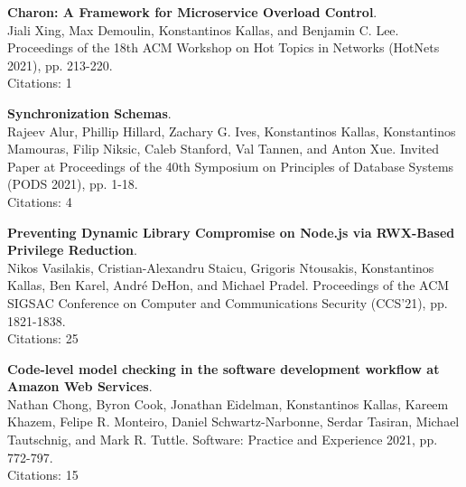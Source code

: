 \begin{minipage}{\textwidth}
\textbf{Charon: A Framework for Microservice Overload Control}. \\
Jiali Xing, Max Demoulin, Konstantinos Kallas, and Benjamin C. Lee.
Proceedings of the 18th ACM Workshop on Hot Topics in Networks (HotNets 2021), pp. 213-220. \\
Citations: 1
\end{minipage}

\begin{minipage}{\textwidth}
\textbf{Synchronization Schemas}. \\
Rajeev Alur, Phillip Hillard, Zachary G. Ives, Konstantinos Kallas, Konstantinos Mamouras, Filip Niksic, Caleb Stanford, Val Tannen, and Anton Xue.
Invited Paper at Proceedings of the 40th Symposium on Principles of Database Systems (PODS 2021), pp. 1-18. \\
Citations: 4
\end{minipage}



\begin{minipage}{\textwidth}
\textbf{Preventing Dynamic Library Compromise on Node.js via RWX-Based Privilege Reduction}. \\
Nikos Vasilakis, Cristian-Alexandru Staicu, Grigoris Ntousakis, Konstantinos Kallas, Ben Karel, André DeHon, and Michael Pradel.
Proceedings of the ACM SIGSAC Conference on Computer and Communications Security (CCS'21), pp. 1821-1838. \\
Citations: 25
\end{minipage}

\begin{minipage}{\textwidth}
\textbf{Code-level model checking in the software development workflow at Amazon Web Services}. \\
Nathan Chong, Byron Cook, Jonathan Eidelman, Konstantinos Kallas, Kareem Khazem, Felipe R. Monteiro, Daniel Schwartz-Narbonne, Serdar Tasiran, Michael Tautschnig, and Mark R. Tuttle.
Software: Practice and Experience 2021, pp. 772-797. \\
Citations: 15
\end{minipage}
    
